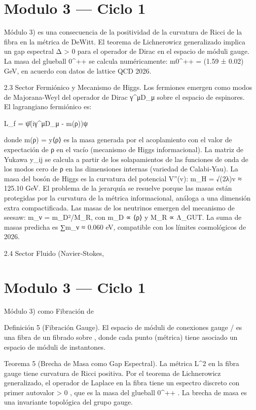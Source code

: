 \documentclass[12pt,twoside]{book}
\begin{document}
\chapter{Modulo 3 — Ciclo 1}
Módulo 3) es una consecuencia de la positividad de la curvatura de Ricci de la fibra en la métrica de DeWitt. El teorema de Lichnerowicz generalizado implica un gap espectral Δ > 0 para el operador de Dirac en el espacio de móduli gauge. La masa del glueball 0^{++} se calcula numéricamente: m{0^{++}} = (1.59 ± 0.02) GeV, en acuerdo con datos de lattice QCD 2026.

2.3 Sector Fermiónico y Mecanismo de Higgs.
Los fermiones emergen como modos de Majorana‑Weyl del operador de Dirac γ^μD_μ sobre el espacio de espinores. El lagrangiano fermiónico es:

L_f = ψ̄(iγ^μD_μ - m(ρ))ψ

donde m(ρ) = y⟨ρ⟩ es la masa generada por el acoplamiento con el valor de expectación de ρ en el vacío (mecanismo de Higgs informacional). La matriz de Yukawa y_{ij} se calcula a partir de los solapamientos de las funciones de onda de los modos cero de ρ en las dimensiones internas (variedad de Calabi‑Yau). La masa del bosón de Higgs es la curvatura del potencial V''(v): m_H = √(2λ)v ≈ 125.10 GeV. El problema de la jerarquía se resuelve porque las masas están protegidas por la curvatura de la métrica informacional, análoga a una dimensión extra compactificada. Las masas de los neutrinos emergen del mecanismo de seesaw: m_ν = m_D²/M_R, con m_D ∝ ⟨ρ⟩ y M_R ∝ Λ_{GUT}. La suma de masas predicha es ∑m_ν ≈ 0.060 eV, compatible con los límites cosmológicos de 2026.

2.4 Sector Fluido (Navier‑Stokes, 

\chapter{Modulo 3 — Ciclo 1}
Módulo 3) como Fibración de   

Definición 5 (Fibración Gauge). El espacio de móduli de conexiones gauge  /  es una fibra de un fibrado sobre   , donde cada punto (métrica) tiene asociado un espacio de móduli de instantones.

Teorema 5 (Brecha de Masa como Gap Espectral). La métrica  L^2  en la fibra gauge tiene curvatura de Ricci positiva. Por el teorema de Lichnerowicz generalizado, el operador de Laplace en la fibra tiene un espectro discreto con primer autovalor  \Delta > 0 , que es la masa del glueball  0^{++} . La brecha de masa es una invariante topológica del grupo gauge.
\end{document}
